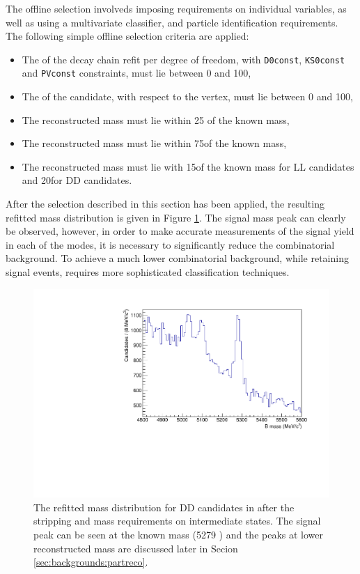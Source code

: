 The offline selection involveds imposing requirements on individual variables, as well as using a multivariate classifier, and particle identification requirements. The following simple offline selection criteria are applied:

\begin{itemize}
\item The \chisq of the decay chain refit per degree of freedom, with {\tt D0const}, {\tt KS0const} and {\tt PVconst} constraints, must lie between 0 and 100, 
\item The \chisqip of the \Bm candidate, with respect to the \Bm vertex, must lie between 0 and 100, 
\item The reconstructed \Dz mass must lie within 25 \mev of the known \Dz mass, 
\item The reconstructed \Kstarm mass must lie within 75\mev of the known \Kstarm mass, 
\item The reconstructed \KS mass must lie with 15\mev of the known \KS mass for LL candidates and 20\mev for DD candidates.
\end{itemize}

After the selection described in this section has been applied, the resulting refitted \Bm mass distribution is given in Figure \ref{fig:BmassbeforeBDT}. The signal \Bm mass peak can clearly be observed, however, in order to make accurate measurements of the signal yield in each of the \Dz modes, it is necessary to significantly reduce the combinatorial background. To achieve a much lower combinatorial background, while retaining signal events, requires more sophisticated classification techniques.

\begin{figure}
\centering
\includegraphics[width=0.6\linewidth]{figures/selection/DataDD_KPi_beforeBDT.pdf}
\caption{The refitted \Bm mass distribution for \kpi DD candidates in \runtwo after the stripping and mass requirements on intermediate states. The \Bm signal peak can be seen at the known \Bm mass (5279 \mevcc) and the peaks at lower reconstructed \Bm mass are discussed later in Secion \ref{sec:backgrounds:partreco}.}
\label{fig:BmassbeforeBDT}
\end{figure}

